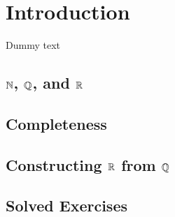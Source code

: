 \section{Introduction}
Dummy text
\subsection{${\mathbb N}$, ${\mathbb Q}$, and ${\mathbb R}$}
\subsection{Completeness}
\subsection{Constructing ${\mathbb R}$ from ${\mathbb Q}$} 
\subsection{Solved Exercises}
